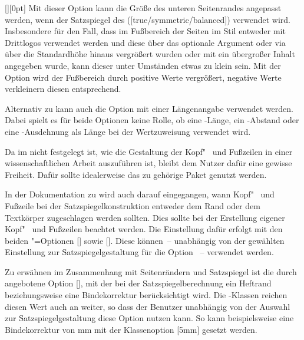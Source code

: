 \begin{Declaration}[v2.03]{[]}[0pt]%
\printdeclarationlist%
%
Mit dieser Option kann die Größe des unteren Seitenrandes angepasst werden, 
wenn der Satzspiegel des \CDs ([true/symmetric/balanced]) 
verwendet wird. Insbesondere für den Fall, dass im Fußbereich der Seiten im 
Stil  entweder mit  Drittlogos verwendet 
werden und diese über das optionale Argument oder via  
über die Standardhöhe hinaus vergrößert wurden oder mit  ein 
übergroßer Inhalt angegeben wurde, kann dieser unter Umständen etwas zu klein 
sein. Mit der Option  wird der Fußbereich durch 
positive Werte vergrößert, negative Werte verkleinern diesen entsprechend. 

Alternativ zu  kann auch die Option  
mit einer Längenangabe verwendet werden. Dabei spielt es für beide Optionen 
keine Rolle, ob eine -Länge, ein -Abstand oder eine 
-Ausdehnung als Länge bei der Wertzuweisung verwendet wird.
\end{Declaration}

%
%
Da im \CD nicht festgelegt ist, wie die Gestaltung der Kopf"~ und Fußzeilen in 
einer wissenschaftlichen Arbeit auszuführen ist, bleibt dem Nutzer dafür eine 
gewisse Freiheit. Dafür sollte idealerweise das zu \KOMAScript{} gehörige Paket 
 genutzt werden. 

In der Dokumentation zu  wird auch darauf eingegangen, wann 
Kopf"~ und Fußzeile bei der Satzspiegelkonstruktion entweder dem Rand oder dem 
Textkörper zugeschlagen werden sollten. Dies sollte bei der Erstellung eigener 
Kopf"~ und Fußzeilen beachtet werden. Die Einstellung dafür erfolgt mit den 
beiden \KOMAScript"=Optionen [\PBoolean] sowie 
[\PBoolean]. Diese können~-- unabhängig von der gewählten 
Einstellung zur Satzspiegelgestaltung für die Option ~-- 
verwendet werden.

%
%
Zu erwähnen im Zusammenhang mit Seitenrändern und Satzspiegel ist die durch 
 angebotene Option [], mit der bei 
der Satzspiegelberechnung ein Heftrand beziehungsweise eine Bindekorrektur 
berücksichtigt wird. Die \TUDScript-Klassen reichen diesen Wert auch an 
 weiter, so dass der Benutzer unabhängig von der Auswahl zur 
Satzspiegelgestaltung diese Option nutzen kann. So kann beispielsweise eine 
Bindekorrektur von \unit[5]{mm} mit der Klassenoption [5mm] 
gesetzt werden.

